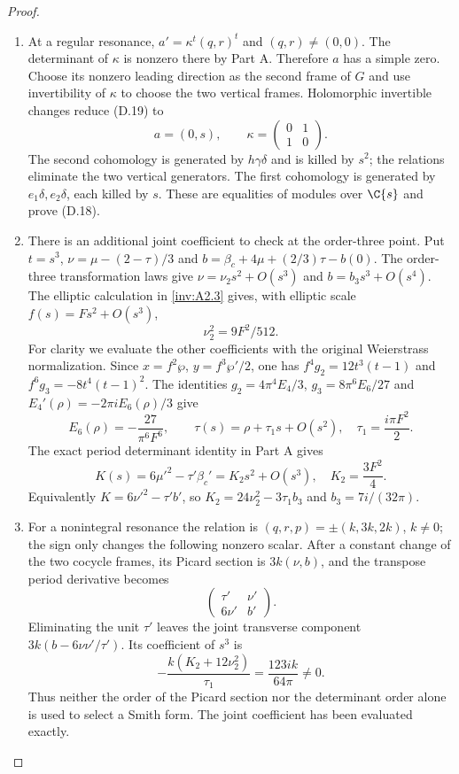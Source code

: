 \begin{proof}
\begin{enumerate}[label=\arabic*.,leftmargin=*]
\item At a regular resonance, $a'=\kappa^t(q,r)^t$ and
$(q,r)\ne(0,0)$. The determinant of $\kappa$ is nonzero there by
Part A. Therefore $a$ has a simple zero. Choose its nonzero leading
direction as the second frame of $G$ and use invertibility of
$\kappa$ to choose the two vertical frames. Holomorphic invertible
changes reduce (D.19) to
\[
 a=(0,s),\qquad \kappa=\begin{pmatrix}0&1\\1&0\end{pmatrix}. \tag{D.21}
\]
The second cohomology is generated by $h\gamma\delta$ and is killed
by $s^2$; the relations eliminate the two vertical generators.
The first cohomology is generated by $e_1\delta,e_2\delta$, each
killed by $s$. These are equalities of modules over $\C\{s\}$
and prove (D.18).

\item There is an additional joint coefficient to check at the order-three
point. Put $t=s^3$, $\nu=\mu-(2-\tau)/3$ and
$b=\beta_c+4\mu+(2/3)\tau-b(0)$. The order-three transformation
laws give $\nu=\nu_2s^2+O(s^3)$ and $b=b_3s^3+O(s^4)$.
The elliptic calculation in \ref{inv:A2.3} gives, with elliptic scale
$f(s)=F s^2+O(s^3)$,
\[
 \nu_2^2=9F^2/512.
\]
For clarity we evaluate the other coefficients with the original
Weierstrass normalization. Since $x=f^2\wp$,
$y=f^3\wp'/2$, one has
$f^4g_2=12t^3(t-1)$ and $f^6g_3=-8t^4(t-1)^2$.
The identities $g_2=4\pi^4E_4/3$, $g_3=8\pi^6E_6/27$ and
$E_4'(\rho)=-2\pi iE_6(\rho)/3$ give
\[
 E_6(\rho)=-\frac{27}{\pi^6F^6},\qquad
 \tau(s)=\rho+\tau_1s+O(s^2),\quad \tau_1=\frac{i\pi F^2}{2}.
\]
The exact period determinant identity in Part A gives
\[
 K(s)=6\mu'^2-\tau'\beta_c'=K_2s^2+O(s^3),
 \quad K_2=\frac{3F^2}{4}.
\]
Equivalently $K=6\nu'^2-\tau'b'$, so
$K_2=24\nu_2^2-3\tau_1b_3$ and $b_3=7i/(32\pi)$.

\item For a nonintegral resonance the relation is
$(q,r,p)=\pm(k,3k,2k)$, $k\ne0$; the sign only changes the
following nonzero scalar. After a constant change of the two
cocycle frames, its Picard section is $3k(\nu,b)$, and the
transpose period derivative becomes
\[
 \begin{pmatrix}\tau'&\nu'\\6\nu'&b'\end{pmatrix}.
\]
Eliminating the unit $\tau'$ leaves the joint transverse component
$3k(b-6\nu\nu'/\tau')$. Its coefficient of $s^3$ is
\[
 -\frac{k(K_2+12\nu_2^2)}{\tau_1}
       =\frac{123ik}{64\pi}\ne0.                      \tag{D.22}
\]
Thus neither the order of the Picard section nor the determinant
order alone is used to select a Smith form. The joint coefficient
has been evaluated exactly.


\end{enumerate}
\end{proof}

